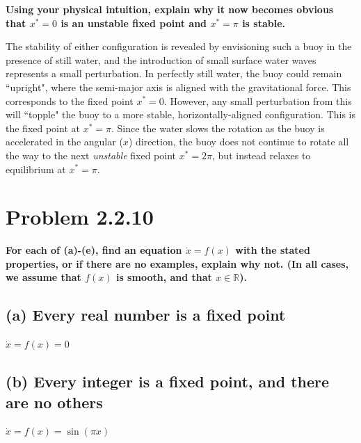 \documentclass[draft]{agujournal2019}
\begin{document}
\textbf{Using your physical intuition, explain why it now becomes obvious that $x^*=0$ is an unstable fixed point and $x^*=\pi$ is stable.}
\par

The stability of either configuration is revealed by envisioning such a buoy in the presence of still water, and the introduction of small surface water waves represents a small perturbation. In perfectly still water, the buoy could remain ``upright", where the semi-major axis is aligned with the gravitational force. This corresponds to the fixed point $x^*=0$. However, any small perturbation from this will ``topple" the buoy to a more stable, horizontally-aligned configuration. This is the fixed point at $x^*=\pi$. Since the water slows the rotation as the buoy is accelerated in the angular ($x$) direction, the buoy does not continue to rotate all the way to the next \emph{unstable} fixed point $x^*=2\pi$, but instead relaxes to equilibrium at $x^*=\pi$.


\newpage



\section{Problem 2.2.10}
\label{sec:p2}
\textbf{For each of (a)-(e), find an equation $\dot x = f(x)$ with the stated properties, or if there are no examples, explain why not. (In all cases, we assume that $f(x)$ is smooth, and that $x\in\mathbb{R}$).}


\subsection{(a) Every real number is a fixed point}
\label{subsec:p2a}
$\dot x = f(x) = 0$


\subsection{(b) Every integer is a fixed point, and there are no others}
\label{subsec:p2b}
$\dot x = f(x) = \sin{(\pi x)}$
\end{document}
